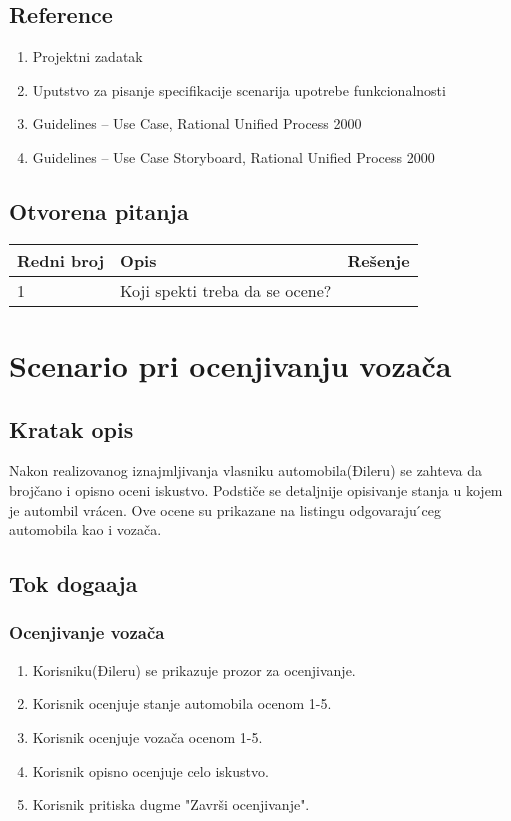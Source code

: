 \documentclass[12pt]{article}
\begin{document}
\subsection{Reference}
\begin{enumerate}
   \item Projektni zadatak
   \item Uputstvo za pisanje specifikacije scenarija upotrebe funkcionalnosti
   \item  Guidelines – Use Case, Rational Unified Process 2000
   \item  Guidelines – Use Case Storyboard, Rational Unified Process 2000
 \end{enumerate}
\subsection{Otvorena pitanja}


\begin{center}
\begin{tabular}{ | m{2cm} | m{7cm}| m{7cm} | } 
\hline
Redni broj& Opis & Rešenje \\ 
\hline
1 & Koji spekti treba da se ocene? & \\ 
\hline
\end{tabular}
\end{center}

    

\section{Scenario pri ocenjivanju vozača}
\subsection{Kratak opis}
Nakon realizovanog iznajmljivanja vlasniku automobila(Đileru) se zahteva da brojčano i
opisno oceni iskustvo. Podstiče se detaljnije opisivanje stanja u kojem je autombil
vrácen. Ove ocene su prikazane na listingu odgovaraju ́ceg automobila kao i vozača.
\subsection{Tok doga\dj aja}

\subsubsection{Ocenjivanje vozača}
\begin{enumerate}
  \item Korisniku(Đileru) se prikazuje prozor za ocenjivanje.
  \item Korisnik ocenjuje stanje automobila ocenom 1-5.
  \item Korisnik ocenjuje vozača ocenom 1-5.
  \item Korisnik opisno ocenjuje celo iskustvo.
  \item Korisnik pritiska dugme "Završi ocenjivanje".
\end{enumerate}
\end{document}
